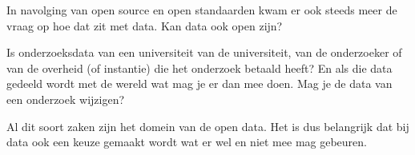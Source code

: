 In navolging van open source en open standaarden kwam er ook steeds meer de vraag op hoe dat zit met data. Kan data ook open zijn?

Is onderzoeksdata van een universiteit van de universiteit, van de onderzoeker of van de overheid (of instantie) die het onderzoek betaald heeft? En als die data gedeeld wordt met de wereld wat mag je er dan mee doen. Mag je de data van een onderzoek wijzigen?

Al dit soort zaken zijn het domein van de open data. Het is dus belangrijk dat bij data ook een keuze gemaakt wordt wat er wel en niet mee mag gebeuren.
